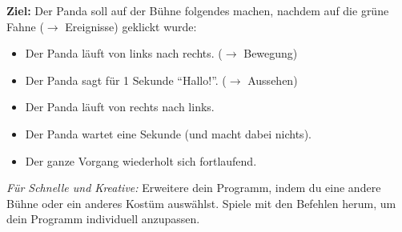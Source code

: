 \documentclass[ngerman, 11pt]{scrreprt}
\begin{document}
	\begin{ziel}
		\textbf{Ziel:} Der Panda soll auf der Bühne folgendes machen, nachdem auf die grüne Fahne ($\rightarrow$ Ereignisse) geklickt wurde:
		\begin{itemize}[itemsep=0ex]
			\item Der Panda läuft von links nach rechts. ($\rightarrow$ Bewegung)
			\item Der Panda sagt für 1 Sekunde \enquote{Hallo!}. ($\rightarrow$ Aussehen)
			\item Der Panda läuft von rechts nach links.
			\item Der Panda wartet eine Sekunde (und macht dabei nichts).
			\item Der ganze Vorgang wiederholt sich fortlaufend.
		\end{itemize}
	\end{ziel}
	
	\emph{Für Schnelle und Kreative:} Erweitere dein Programm, indem du eine andere Bühne oder ein anderes Kostüm auswählst. Spiele mit den Befehlen herum, um dein Programm individuell anzupassen.
\end{document}
